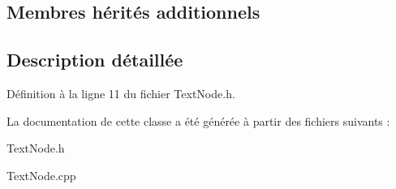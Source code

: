 \subsection*{Membres hérités additionnels}


\subsection{Description détaillée}


Définition à la ligne 11 du fichier Text\+Node.\+h.



La documentation de cette classe a été générée à partir des fichiers suivants \+:\begin{DoxyCompactItemize}
\item 
Text\+Node.\+h\item 
Text\+Node.\+cpp\end{DoxyCompactItemize}
